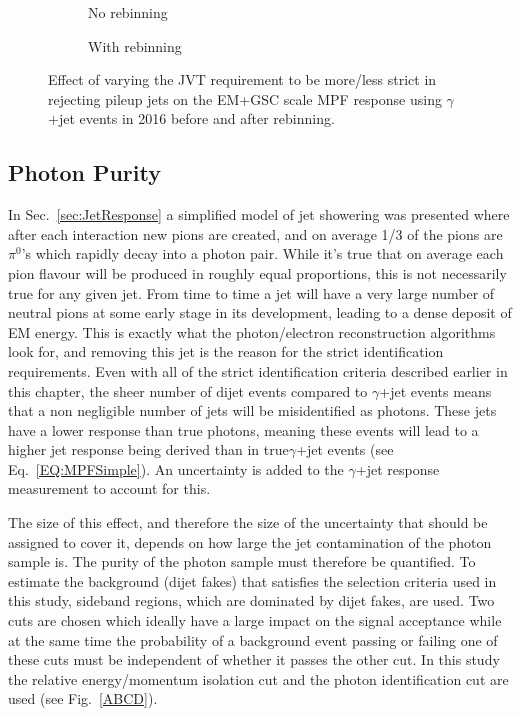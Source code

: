 \begin{figure}[!ht]
\centering
\begin{subfigure}{.5\textwidth}
\centering
{}
\caption{No rebinning}
\end{subfigure}%
\begin{subfigure}{.5\textwidth}  \centering
{}
\caption{With rebinning}
\end{subfigure}
\caption{Effect of varying the JVT requirement to be more/less strict in rejecting pileup jets on the EM+GSC scale MPF response using $\gamma$+jet events in 2016 before and after rebinning. }
\label{Fig:GJetJVTEM2016}
\end{figure}

\subsection{Photon Purity}

In Sec.~\ref{sec:JetResponse} a simplified model of jet showering was presented where after each interaction new pions are created, and on average 1/3 of the pions are $\pi^0$'s which rapidly decay into a photon pair.  
While it's true that on average each pion flavour will be produced in roughly equal proportions, this is not necessarily true for any given jet.  
From time to time a jet will have a very large number of neutral pions at some early stage in its development, leading to a dense deposit of EM energy.  
This is exactly what the photon/electron reconstruction algorithms look for, and removing this jet is the reason for the strict identification requirements.  
Even with all of the strict identification criteria described earlier in this chapter, the sheer number of dijet events compared to $\gamma$+jet events means that a non negligible number of jets will be misidentified as photons.  
These jets have a lower response than true photons, meaning these events will lead to a higher jet response being derived than in true$\gamma$+jet events (see Eq.~\ref{EQ:MPFSimple}).  
An uncertainty is added to the $\gamma$+jet response measurement to account for this.  

The size of this effect, and therefore the size of the uncertainty that should be assigned to cover it, depends on how large the jet contamination of the photon sample is.  
The purity of the photon sample must therefore be quantified.  
To estimate the background (dijet fakes) that  satisfies the selection criteria used in this study, sideband regions, which are dominated by dijet fakes, are used.  
Two cuts are chosen which ideally have a large impact on the signal acceptance while at the same time the probability of a background event passing or failing one of these cuts must be independent of whether it passes the other cut.  
In this study the relative energy/momentum isolation cut and the photon identification cut are used (see Fig.~\ref{ABCD}).  

